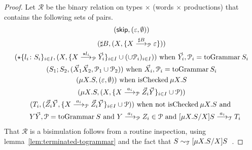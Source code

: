 \begin{proof}
  Let $\mathcal R$ be the binary relation on types $\times$ (words
  $\times$ productions) that contains the following sets of pairs.
  \begin{gather*}
    (\skipk, (\varepsilon, \emptyset))
    \\
    (\sharp B, (X, \{X \LTSderivesP[\sharp B] \varepsilon\}))
    \\
    (\star\{l_i\colon S_i\}_{i\in I}, (X, \{X \LTSderivesP[\star l_i]
    \vec Y_i\}_{i\in I} \cup (\cup \mathcal P_i)_{i\in I}))
    \text{ when } \vec Y_i,\mathcal P_i = \toGrammarf{S_i}
    \\
    (S_1;S_2, (\vec X_1\vec X_2, \mathcal P_1 \cup \mathcal P_2))
    \text{ when } \vec X_i,\mathcal P_i = \toGrammarf{S_i}
    \\
    (\mu X.S, (\varepsilon, \emptyset))
    \text{ when } \isCheckedf \mu X.S
    \\
    (\mu X.S, (X, \{X \LTSderivesP[a_i] \vec Z_i\vec Y\}_{i\in I} \cup \mathcal P))
    \\
    (T_i, (\vec Z_i\vec Y, \{X \LTSderivesP[a_i] \vec Z_i\vec Y\}_{i\in I} \cup \mathcal P))
   \text{ when not }  \isCheckedf \mu X.S \text{ and }
   \\\quad 
   Y\vec Y,\mathcal P = \toGrammarf{S}
   \text{ and } Y \LTSderivesP[a_i] Z_i \in \mathcal P 
   \text{ and } \subs{\mu X.S}{X} S \LTSderives[a_i] T_i
  \end{gather*}
  That $\mathcal R$ is a bisimulation follows from a routine inspection,
  using lemma~\ref{lem:terminated-togrammar} and the fact that
  $S \sim_\mathcal T [{\mu X.S}/{X}] S$~\cite{thiemann2016context}. 
\end{proof}



